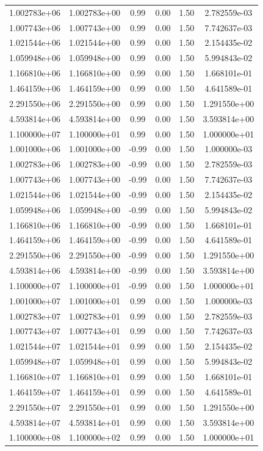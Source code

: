 \documentclass{article}
\begin{document}
\begin{table}[htbp]
\begin{tabular}{cccccc}
1.002783e+06 & 1.002783e+00 & 0.99 & 0.00 & 1.50 & 2.782559e-03 \\
1.007743e+06 & 1.007743e+00 & 0.99 & 0.00 & 1.50 & 7.742637e-03 \\
1.021544e+06 & 1.021544e+00 & 0.99 & 0.00 & 1.50 & 2.154435e-02 \\
1.059948e+06 & 1.059948e+00 & 0.99 & 0.00 & 1.50 & 5.994843e-02 \\
1.166810e+06 & 1.166810e+00 & 0.99 & 0.00 & 1.50 & 1.668101e-01 \\
1.464159e+06 & 1.464159e+00 & 0.99 & 0.00 & 1.50 & 4.641589e-01 \\
2.291550e+06 & 2.291550e+00 & 0.99 & 0.00 & 1.50 & 1.291550e+00 \\
4.593814e+06 & 4.593814e+00 & 0.99 & 0.00 & 1.50 & 3.593814e+00 \\
1.100000e+07 & 1.100000e+01 & 0.99 & 0.00 & 1.50 & 1.000000e+01 \\
1.001000e+06 & 1.001000e+00 & -0.99 & 0.00 & 1.50 & 1.000000e-03 \\
1.002783e+06 & 1.002783e+00 & -0.99 & 0.00 & 1.50 & 2.782559e-03 \\
1.007743e+06 & 1.007743e+00 & -0.99 & 0.00 & 1.50 & 7.742637e-03 \\
1.021544e+06 & 1.021544e+00 & -0.99 & 0.00 & 1.50 & 2.154435e-02 \\
1.059948e+06 & 1.059948e+00 & -0.99 & 0.00 & 1.50 & 5.994843e-02 \\
1.166810e+06 & 1.166810e+00 & -0.99 & 0.00 & 1.50 & 1.668101e-01 \\
1.464159e+06 & 1.464159e+00 & -0.99 & 0.00 & 1.50 & 4.641589e-01 \\
2.291550e+06 & 2.291550e+00 & -0.99 & 0.00 & 1.50 & 1.291550e+00 \\
4.593814e+06 & 4.593814e+00 & -0.99 & 0.00 & 1.50 & 3.593814e+00 \\
1.100000e+07 & 1.100000e+01 & -0.99 & 0.00 & 1.50 & 1.000000e+01 \\
1.001000e+07 & 1.001000e+01 & 0.99 & 0.00 & 1.50 & 1.000000e-03 \\
1.002783e+07 & 1.002783e+01 & 0.99 & 0.00 & 1.50 & 2.782559e-03 \\
1.007743e+07 & 1.007743e+01 & 0.99 & 0.00 & 1.50 & 7.742637e-03 \\
1.021544e+07 & 1.021544e+01 & 0.99 & 0.00 & 1.50 & 2.154435e-02 \\
1.059948e+07 & 1.059948e+01 & 0.99 & 0.00 & 1.50 & 5.994843e-02 \\
1.166810e+07 & 1.166810e+01 & 0.99 & 0.00 & 1.50 & 1.668101e-01 \\
1.464159e+07 & 1.464159e+01 & 0.99 & 0.00 & 1.50 & 4.641589e-01 \\
2.291550e+07 & 2.291550e+01 & 0.99 & 0.00 & 1.50 & 1.291550e+00 \\
4.593814e+07 & 4.593814e+01 & 0.99 & 0.00 & 1.50 & 3.593814e+00 \\
1.100000e+08 & 1.100000e+02 & 0.99 & 0.00 & 1.50 & 1.000000e+01 \\
\hline
\end{tabular}
\end{table}
\end{document}
